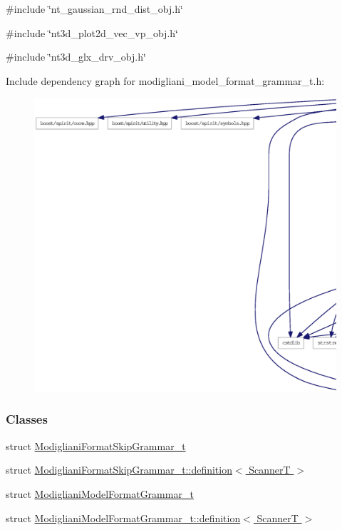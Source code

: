 {\ttfamily \#include \char`\"{}nt\_\-gaussian\_\-rnd\_\-dist\_\-obj.h\char`\"{}}\par
{\ttfamily \#include \char`\"{}nt3d\_\-plot2d\_\-vec\_\-vp\_\-obj.h\char`\"{}}\par
{\ttfamily \#include \char`\"{}nt3d\_\-glx\_\-drv\_\-obj.h\char`\"{}}\par
Include dependency graph for modigliani\_\-model\_\-format\_\-grammar\_\-t.h:
\nopagebreak
\begin{figure}[H]
\begin{center}
\leavevmode
\includegraphics[width=400pt]{modigliani__model__format__grammar__t_8h__incl}
\end{center}
\end{figure}
\subsubsection*{Classes}
\begin{DoxyCompactItemize}
\item 
struct \hyperlink{struct_modigliani_format_skip_grammar__t}{ModiglianiFormatSkipGrammar\_\-t}
\item 
struct \hyperlink{struct_modigliani_format_skip_grammar__t_1_1definition}{ModiglianiFormatSkipGrammar\_\-t::definition$<$ ScannerT $>$}
\item 
struct \hyperlink{struct_modigliani_model_format_grammar__t}{ModiglianiModelFormatGrammar\_\-t}
\item 
struct \hyperlink{struct_modigliani_model_format_grammar__t_1_1definition}{ModiglianiModelFormatGrammar\_\-t::definition$<$ ScannerT $>$}
\end{DoxyCompactItemize}
